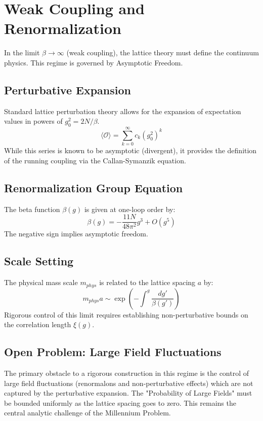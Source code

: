 \section{Weak Coupling and Renormalization}
\label{sec:weak_coupling}

In the limit $\beta \to \infty$ (weak coupling), the lattice theory must define the continuum physics. This regime is governed by Asymptotic Freedom.

\subsection{Perturbative Expansion}
Standard lattice perturbation theory allows for the expansion of expectation values in powers of $g_0^2 = 2N/\beta$.
\begin{equation}
\langle \mathcal{O} \rangle = \sum_{k=0}^\infty c_k (g_0^2)^k
\end{equation}
While this series is known to be asymptotic (divergent), it provides the definition of the running coupling via the Callan-Symanzik equation.

\subsection{Renormalization Group Equation}
The beta function $\beta(g)$ is given at one-loop order by:
\begin{equation}
\beta(g) = -\frac{11N}{48\pi^2} g^3 + O(g^5)
\end{equation}
The negative sign implies asymptotic freedom.

\subsection{Scale Setting}
The physical mass scale $m_{phys}$ is related to the lattice spacing $a$ by:
\begin{equation}
m_{phys} a \sim \exp\left( -\int^g \frac{dg'}{\beta(g')} \right)
\end{equation}
Rigorous control of this limit requires establishing non-perturbative bounds on the correlation length $\xi(g)$.

\subsection{Open Problem: Large Field Fluctuations}
The primary obstacle to a rigorous construction in this regime is the control of large field fluctuations (renormalons and non-perturbative effects) which are not captured by the perturbative expansion. The "Probability of Large Fields" must be bounded uniformly as the lattice spacing goes to zero. This remains the central analytic challenge of the Millennium Problem.
